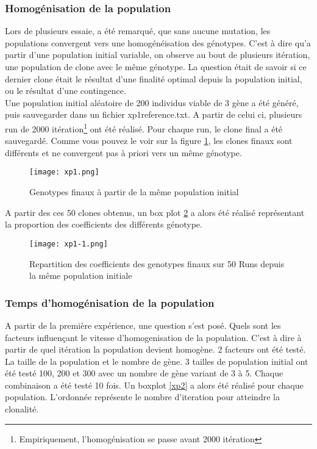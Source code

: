 \documentclass{article}
\begin{document}
	\subsubsection{Homogénisation de la population}
	Lors de plusieurs essaie, a été remarqué, que sans aucune mutation, les populations convergent vers une homogénéisation des génotypes. C'est à dire qu'a partir d'une population initial variable, on observe au bout de plusieurs itération, une population de clone avec le même génotype. La question était de savoir si ce dernier clone était le résultat d'une finalité optimal depuis la population initial, ou le résultat d'une contingence. \\
	Une population initial aléatoire de 200 individus viable de 3 gène a été généré, puis sauvegarder dans un fichier xp1reference.txt. A partir de celui ci, plusieurs run de 2000 itération\footnote{Empiriquement, l'homogénisation se passe avant 2000 itération} ont été réalisé. Pour chaque run, le clone final a été sauvegardé. Comme vous pouvez le voir sur la figure \ref{xp1}, les clones finaux sont différents et ne convergent pas à priori vers un même génotype. 

	\begin{figure}[h]
	\label{xp1}
	\caption[test]{Genotypes finaux à partir de la même population initial}
	\centering
	\texttt{[image: xp1.png]}
	\end{figure}


	A partir des ces 50 clones obtenus, un box plot \ref{xp1.1} a alors été réalisé représentant la proportion des coefficients des différents génotype.

	\begin{figure}[h]
	\label{xp1.1}
	\centering
	\caption[test]{Repartition des coefficients des genotypes finaux sur 50 Runs depuis la même population initiale}
	\texttt{[image: xp1-1.png]}
	\end{figure}


	\subsubsection{ Temps d'homogénisation de la population}
	A partir de la première expérience, une question s'est posé. Quels sont les facteurs influençant le vitesse d'homogenisation de la population. C'est à dire à partir de quel itération la population devient homogène. 
	2 facteurs ont été testé. La taille de la population et le nombre de gène. 3 tailles de population initial ont été testé 100, 200 et 300 avec un nombre de gène variant de 3 à 5. Chaque combinaison a été testé 10 fois. Un boxplot \ref{xp2} a alors été réalisé pour chaque population. L'ordonnée représente le nombre d'iteration pour atteindre la clonalité. 
\end{document}
